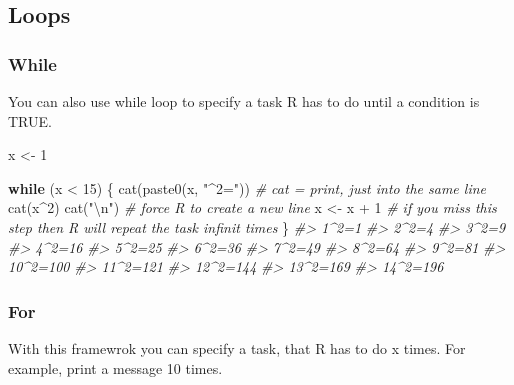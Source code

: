 \documentclass[
]{article}
\newenvironment{Shaded}{\begin{snugshade}}{\end{snugshade}}
\newcommand{\CommentTok}[1]{\textcolor[rgb]{0.56,0.35,0.01}{\textit{#1}}}
\newcommand{\ControlFlowTok}[1]{\textcolor[rgb]{0.13,0.29,0.53}{\textbf{#1}}}
\newcommand{\DecValTok}[1]{\textcolor[rgb]{0.00,0.00,0.81}{#1}}
\newcommand{\FunctionTok}[1]{\textcolor[rgb]{0.00,0.00,0.00}{#1}}
\newcommand{\NormalTok}[1]{#1}
\newcommand{\OtherTok}[1]{\textcolor[rgb]{0.56,0.35,0.01}{#1}}
\newcommand{\SpecialCharTok}[1]{\textcolor[rgb]{0.00,0.00,0.00}{#1}}
\newcommand{\StringTok}[1]{\textcolor[rgb]{0.31,0.60,0.02}{#1}}
\begin{document}
\hypertarget{loops}{%
\subsection{Loops}\label{loops}}

\hypertarget{while}{%
\subsubsection{While}\label{while}}

You can also use while loop to specify a task R has to do until a condition is TRUE.

\begin{Shaded}
\begin{Highlighting}[]
\NormalTok{x }\OtherTok{\textless{}{-}} \DecValTok{1}

\ControlFlowTok{while}\NormalTok{ (x }\SpecialCharTok{\textless{}} \DecValTok{15}\NormalTok{) \{}
  \FunctionTok{cat}\NormalTok{(}\FunctionTok{paste0}\NormalTok{(x, }\StringTok{"\^{}2="}\NormalTok{)) }\CommentTok{\# cat = print, just into the same line}
  \FunctionTok{cat}\NormalTok{(x}\SpecialCharTok{\^{}}\DecValTok{2}\NormalTok{)}
  \FunctionTok{cat}\NormalTok{(}\StringTok{"}\SpecialCharTok{\textbackslash{}n}\StringTok{"}\NormalTok{) }\CommentTok{\# force R to create a new line}
\NormalTok{  x }\OtherTok{\textless{}{-}}\NormalTok{ x }\SpecialCharTok{+} \DecValTok{1} \CommentTok{\# if you miss this step then R will repeat the task infinit times}
\NormalTok{\}}
\CommentTok{\#\textgreater{} 1\^{}2=1}
\CommentTok{\#\textgreater{} 2\^{}2=4}
\CommentTok{\#\textgreater{} 3\^{}2=9}
\CommentTok{\#\textgreater{} 4\^{}2=16}
\CommentTok{\#\textgreater{} 5\^{}2=25}
\CommentTok{\#\textgreater{} 6\^{}2=36}
\CommentTok{\#\textgreater{} 7\^{}2=49}
\CommentTok{\#\textgreater{} 8\^{}2=64}
\CommentTok{\#\textgreater{} 9\^{}2=81}
\CommentTok{\#\textgreater{} 10\^{}2=100}
\CommentTok{\#\textgreater{} 11\^{}2=121}
\CommentTok{\#\textgreater{} 12\^{}2=144}
\CommentTok{\#\textgreater{} 13\^{}2=169}
\CommentTok{\#\textgreater{} 14\^{}2=196}
\end{Highlighting}
\end{Shaded}

\hypertarget{for}{%
\subsubsection{For}\label{for}}

With this framewrok you can specify a task, that R has to do x times. For example, print a message 10 times.
\end{document}
